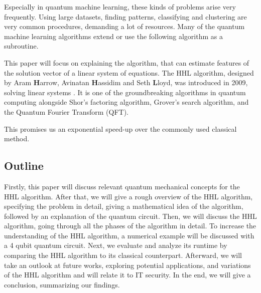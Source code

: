 Especially in quantum machine learning, these kinds of problems arise very frequently. 
Using large datasets, finding patterns, classifying and clustering are very common procedures, demanding a lot of resources. 
Many of the quantum machine learning algorithms extend or use the following algorithm as a subroutine. 

This paper will focus on explaining the algorithm, that can estimate features of the solution vector of a linear system of equations.
The HHL algorithm, designed by Aram \textbf{H}arrow, Avinatan \textbf{H}assidim and Seth \textbf{L}loyd, was introduced in 2009, solving linear systems \cite{hhl}.
It is one of the groundbreaking algorithms in quantum computing alongside Shor's factoring algorithm, Grover's search algorithm, and the Quantum Fourier Transform (QFT).


This promises us an exponential speed-up over the commonly used classical method.

\subsection{Outline}
Firstly, this paper will discuss relevant quantum mechanical concepts for the HHL algorithm.
After that, we will give a rough overview of the HHL algorithm, specifying the problem in detail, giving a mathematical idea of the algorithm, followed by an explanation of the quantum circuit.
Then, we will discuss the HHL algorithm, going through all the phases of the algorithm in detail. 
To increase the understanding of the HHL algorithm, a numerical example will be discussed with a 4 qubit quantum circuit.
Next, we evaluate and analyze its runtime by comparing the HHL algorithm to its classical counterpart. 
Afterward, we will take an outlook at future works, exploring potential applications, and variations of the HHL algorithm and will relate it to IT security. 
In the end, we will give a conclusion, summarizing our findings. 


